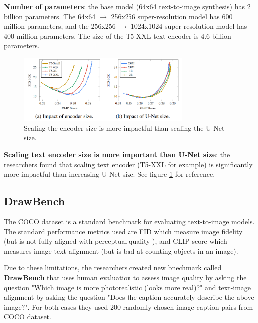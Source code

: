 \textbf{Number of parameters}: the base model (64x64 text-to-image synthesis) has 2 billion parameters. The 64x64 $\rightarrow$ 256x256 super-resolution model has 600 million parameters, and the 256x256 $\rightarrow$ 1024x1024 super-resolution model has 400 million parameters. The size of the T5-XXL text encoder is 4.6 billion parameters.

\begin{figure}
    \centering
    \includegraphics[width=0.75\textwidth]{images/imagen/encoder_vs_unet_size_impact.png}
    \caption{Scaling the encoder size is more impactful than scaling the U-Net size.}
    \label{fig:imagen_scaling_encoder_more_impactful_than_unet_scaling}
\end{figure}

\textbf{Scaling text encoder size is more important than U-Net size}: the researchers found that scaling text encoder (T5-XXL for example) is significantly more impactful than increasing U-Net size. See figure \ref{fig:imagen_scaling_encoder_more_impactful_than_unet_scaling} for reference.
















\subsection{DrawBench}

The COCO dataset \cite{coco_dataset} is a standard benchmark for evaluating text-to-image models. The standard performance metrics used are FID \cite{fid_score} which measure image fidelity (but is not fully aligned with perceptual quality \cite{perceptual_quality}), and CLIP score \cite{openai_clip} which measures image-text alignment (but is bad at counting objects in an image).

Due to these limitations, the researchers created new bnechmark called \textbf{DrawBench} that uses human evaluation to assess image quality by asking the question "Which image is more photorealistic (looks more real)?" and text-image alignment by asking the question "Does the caption accurately describe the above image?". For both cases they used 200 randomly chosen image-caption pairs from COCO dataset.

